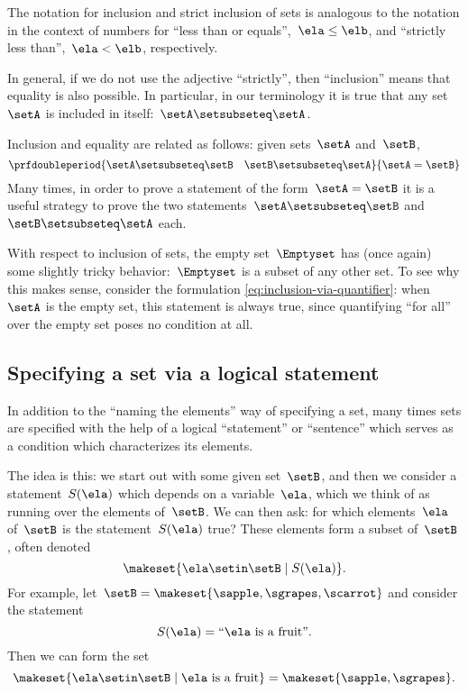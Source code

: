 The notation for inclusion and strict inclusion of sets is analogous to the notation in the context of numbers for ``less than or equals'',~$\ela \leq \elb$,  and ``strictly less than'',~$\ela < \elb$, respectively.

In general, if we do not use the adjective ``strictly'', then ``inclusion'' means that equality is also possible.
In particular, in our terminology it is true that any set~$\setA$ is included in itself:~$\setA \setsubseteq \setA$.

Inclusion and equality are related as follows: given sets~$\setA$ and~$\setB$,
%
\begin{equation}
    \prfdoubleperiod
    {\setA \setsubseteq \setB
        \quad
        \setB \setsubseteq \setA}{
        \setA = \setB}
\end{equation}
%
Many times, in order to prove a statement of the form~$\setA = \setB$ it is a useful strategy to prove the two statements~$\setA \setsubseteq \setB$ and~$\setB \setsubseteq \setA$ each.

With respect to inclusion of sets, the empty set~$\Emptyset$ has (once again) some slightly tricky behavior:~$\Emptyset$ is a subset of any other set.
To see why this makes sense, consider the formulation \cref{eq:inclusion-via-quantifier}: when~$\setA$ is the empty set, this statement is always true, since quantifying ``for all'' over the empty set poses no condition at all.

\subsection{Specifying a set via a logical statement}

In addition to the ``naming the elements'' way of specifying a set, many times sets are specified with the help of a logical ``statement'' or ``sentence'' which serves as a condition which characterizes its elements.

The idea is this: we start out with some given set~$\setB$, and then we consider a statement~$S(\ela)$ which depends on a variable~$\ela$, which we think of as running over the elements of~$\setB$.
We can then ask: for which elements~$\ela$ of~$\setB$ is the statement~$S(\ela)$ true?
These elements form a subset of~$\setB$, often denoted
%
\begin{equation}
    \label{eq:axiom-specialization}
    \makeset{ \ela \setin\setB \mid S(\ela) }.
\end{equation}
%
For example, let~$\setB = \makeset{ \sapple, \sgrapes, \scarrot}$ and consider the statement
%
\begin{equation}
    S(\ela) = \text{``$\ela$ is a fruit''}.
\end{equation}
%
Then we can form the set
%
\begin{equation}
    \makeset{ \ela \setin\setB \mid \ela \text{ is a fruit} } = \makeset{ \sapple, \sgrapes }.
\end{equation}


